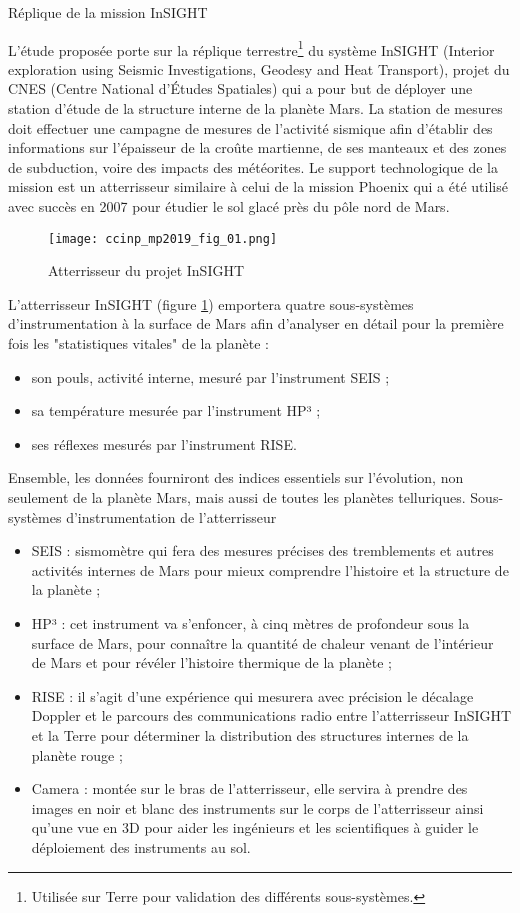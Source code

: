 Réplique de la mission InSIGHT

L'étude proposée porte sur la réplique terrestre\footnote{Utilisée sur Terre pour validation des différents sous-systèmes.} du système InSIGHT (Interior exploration using
Seismic Investigations, Geodesy and Heat Transport), projet du CNES (Centre National d’Études
Spatiales) qui a pour but de déployer une station d'étude de la structure interne de la planète Mars.
La station de mesures doit effectuer une campagne de mesures de l'activité sismique afin d'établir des
informations sur l'épaisseur de la croûte martienne, de ses manteaux et des zones de subduction, voire
des impacts des météorites.
Le support technologique de la mission est un atterrisseur similaire à celui de la mission Phoenix qui
a été utilisé avec succès en 2007 pour étudier le sol glacé près du pôle nord de Mars.

\begin{figure}[!h]
\centering
\texttt{[image: ccinp\_mp2019\_fig\_01.png]}
\caption{Atterrisseur du projet InSIGHT \label{ccinp_mp2019_fig_01}}
\end{figure}



L'atterrisseur InSIGHT (figure \ref{ccinp_mp2019_fig_01}) emportera quatre sous-systèmes d’instrumentation à la surface de
Mars afin d’analyser en détail pour la première fois les "statistiques vitales" de la planète :
\begin{itemize}
\item son pouls, activité interne, mesuré par l'instrument SEIS ;
\item sa température mesurée par l'instrument HP³ ;
\item ses réflexes mesurés par l'instrument RISE.
\end{itemize}
Ensemble, les données fourniront des indices essentiels sur l'évolution, non seulement de la planète
Mars, mais aussi de toutes les planètes telluriques.
Sous-systèmes d’instrumentation de l’atterrisseur
\begin{itemize}
\item SEIS : sismomètre qui fera des mesures précises des tremblements et autres activités internes
de Mars pour mieux comprendre l'histoire et la structure de la planète ;
\item HP³ : cet instrument va s’enfoncer, à cinq mètres de profondeur sous la surface de Mars, pour
connaître la quantité de chaleur venant de l'intérieur de Mars et pour révéler l'histoire
thermique de la planète ;
\item RISE : il s’agit d’une expérience qui mesurera avec précision le décalage Doppler et le
parcours des communications radio entre l'atterrisseur InSIGHT et la Terre pour déterminer
la distribution des structures internes de la planète rouge ;
\item Camera : montée sur le bras de l'atterrisseur, elle servira à prendre des images en noir et blanc
des instruments sur le corps de l'atterrisseur ainsi qu'une vue en 3D pour aider les ingénieurs
et les scientifiques à guider le déploiement des instruments au sol. 
\end{itemize}


